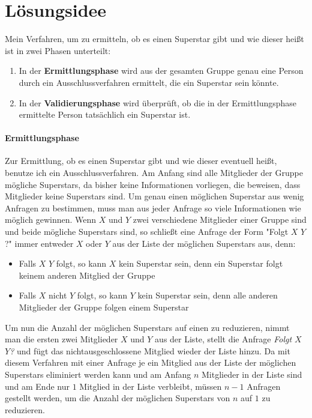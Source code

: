 \documentclass[a4paper,10pt,ngerman]{scrartcl}
\title{\Aufgabe}
\author{\Name\\Team-ID: \TeamId}
\date{\today}
\begin{document}
\maketitle
\tableofcontents
\clearpage

\section{Lösungsidee}
Mein Verfahren, um zu ermitteln, ob es einen Superstar gibt und wie dieser heißt ist in zwei
Phasen unterteilt:
\begin{enumerate}
\item In der \textbf{Ermittlungsphase} wird aus der gesamten Gruppe genau eine Person durch ein Ausschlussverfahren
ermittelt, die ein Superstar sein könnte. 
\item In der \textbf{Validierungsphase} wird überprüft, ob die in der Ermittlungsphase 
ermittelte Person tatsächlich ein Superstar ist.
\end{enumerate}

\paragraph{Ermittlungsphase}
Zur Ermittlung, ob es einen Superstar gibt und wie dieser eventuell heißt, benutze ich
ein Ausschlussverfahren. Am Anfang sind alle Mitglieder der Gruppe mögliche Superstars,
da bisher keine Informationen vorliegen, die beweisen, dass Mitglieder keine Superstars
sind.
Um genau einen möglichen Superstar aus wenig Anfragen zu bestimmen, muss man aus jeder Anfrage
so viele Informationen wie möglich gewinnen.
Wenn $X$ und $Y$ zwei verschiedene Mitglieder einer Gruppe sind und beide mögliche Superstars
sind, so schließt eine Anfrage der Form "Folgt $X$ $Y$?" immer entweder $X$ oder $Y$ aus der
Liste der möglichen Superstars aus, denn:
\begin{itemize}
  \item Falls $X$ $Y$ folgt, so kann $X$ kein Superstar sein, denn ein Superstar folgt keinem
  anderen Mitglied der Gruppe
  \item Falls $X$ nicht $Y$ folgt, so kann $Y$ kein Superstar sein, denn alle anderen Mitglieder
  der Gruppe folgen einem Superstar
\end{itemize}
Um nun die Anzahl der möglichen Superstars auf einen zu reduzieren, nimmt man die ersten
zwei Mitglieder $X$ und $Y$ aus der Liste, stellt die Anfrage \textit{Folgt $X$ $Y$?} und fügt
das nichtausgeschlossene Mitglied wieder der Liste hinzu.\newline
Da mit diesem Verfahren mit einer Anfrage je ein Mitglied aus der Liste der möglichen Superstars
eliminiert werden kann und am Anfang $n$ Mitglieder in der Liste sind und am Ende nur $1$ Mitglied
in der Liste verbleibt, müssen $n-1$ Anfragen gestellt werden, um die Anzahl der möglichen
Superstars von $n$ auf $1$ zu reduzieren.
\end{document}
